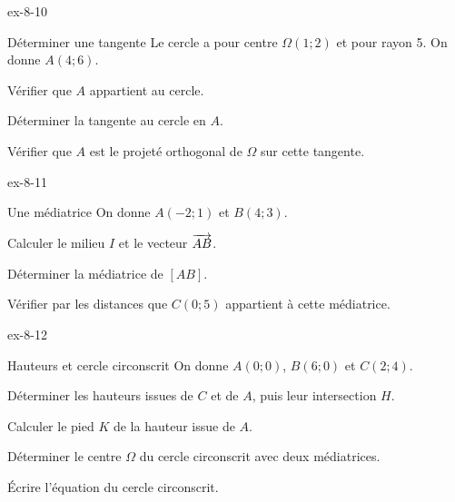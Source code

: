 \begin{blocLivre}{ex-8-10}
\begin{exercice}[2]{Déterminer une tangente}
Le cercle a pour centre $\Omega(1;2)$ et pour rayon 5. On donne $A(4;6)$.\begin{questions}
\item Vérifier que $A$ appartient au cercle.
\item Déterminer la tangente au cercle en $A$.
\item Vérifier que $A$ est le projeté orthogonal de $\Omega$ sur cette tangente.
\end{questions}

\label{figgeo-08-10-ex}
\end{exercice}
\end{blocLivre}
\begin{blocLivre}{ex-8-11}
\begin{exercice}[2]{Une médiatrice}
On donne $A(-2;1)$ et $B(4;3)$.\begin{questions}
\item Calculer le milieu $I$ et le vecteur $\overrightarrow{AB}$.
\item Déterminer la médiatrice de $[AB]$.
\item Vérifier par les distances que $C(0;5)$ appartient à cette médiatrice.
\end{questions}

\label{figgeo-08-11-ex}
\end{exercice}
\end{blocLivre}
\clearpage
{}
\begin{blocLivre}{ex-8-12}
\begin{exercice}[3]{Hauteurs et cercle circonscrit}
On donne $A(0;0)$, $B(6;0)$ et $C(2;4)$.\begin{questions}
\item Déterminer les hauteurs issues de $C$ et de $A$, puis leur intersection $H$.
\item Calculer le pied $K$ de la hauteur issue de $A$.
\item Déterminer le centre $\Omega$ du cercle circonscrit avec deux médiatrices.
\item Écrire l’équation du cercle circonscrit.
\end{questions}

\label{figgeo-08-12-ex}
\end{exercice}
\end{blocLivre}
